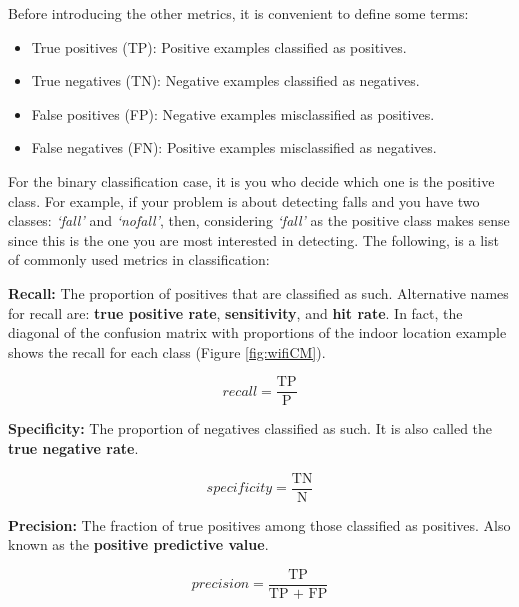 \documentclass[
  11pt,
]{krantz}
\providecommand{\tightlist}{%
  \setlength{\itemsep}{0pt}\setlength{\parskip}{0pt}}
\begin{document}
Before introducing the other metrics, it is convenient to define some terms:

\begin{itemize}
\tightlist
\item
  True positives (TP): Positive examples classified as positives.
\item
  True negatives (TN): Negative examples classified as negatives.
\item
  False positives (FP): Negative examples misclassified as positives.
\item
  False negatives (FN): Positive examples misclassified as negatives.
\end{itemize}

For the binary classification case, it is you who decide which one is the positive class. For example, if your problem is about detecting falls and you have two classes: \emph{`fall'} and \emph{`nofall'}, then, considering \emph{`fall'} as the positive class makes sense since this is the one you are most interested in detecting. The following, is a list of commonly used metrics in classification:

\textbf{Recall:} The proportion of positives that are classified as such. Alternative names for recall are: \textbf{true positive rate}, \textbf{sensitivity}, and \textbf{hit rate}. In fact, the diagonal of the confusion matrix with proportions of the indoor location example shows the recall for each class (Figure \ref{fig:wifiCM}).

\begin{equation}
  recall = \frac{\textrm{TP}}{\textrm{P}}
  \label{eq:metricRecall}
\end{equation}

\textbf{Specificity:} The proportion of negatives classified as such. It is also called the \textbf{true negative rate}.

\begin{equation}
  specificity = \frac{\textrm{TN}}{\textrm{N}}
  \label{eq:metricSpecificity}
\end{equation}

\textbf{Precision:} The fraction of true positives among those classified as positives. Also known as the \textbf{positive predictive value}.

\begin{equation}
  precision = \frac{\textrm{TP}}{\textrm{TP + FP}}
  \label{eq:metricPrecision}
\end{equation}
\end{document}

